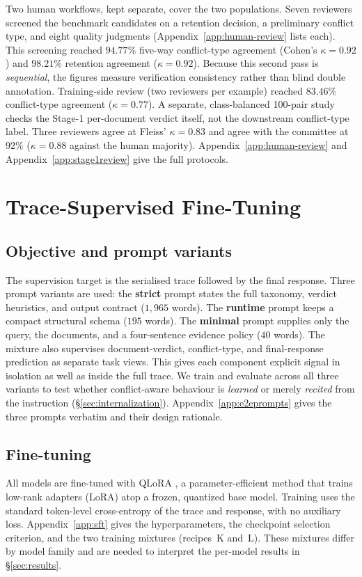 Two human workflows, kept separate, cover the two populations. Seven
reviewers screened the benchmark candidates on a retention decision, a
preliminary conflict type, and eight quality judgments
(Appendix~\ref{app:human-review} lists each). This screening reached
$94.77\%$ five-way conflict-type agreement (Cohen's $\kappa=0.92$) and $98.21\%$
retention agreement ($\kappa=0.92$). Because this second pass is
\emph{sequential}, the figures measure verification consistency rather than
blind double annotation. Training-side review (two reviewers per example)
reached $83.46\%$ conflict-type agreement ($\kappa=0.77$). A separate,
class-balanced 100-pair study checks the Stage-1 per-document verdict itself,
not the downstream conflict-type label. Three reviewers agree at Fleiss'
$\kappa=0.83$ and agree with the committee at $92\%$ ($\kappa=0.88$ against
the human majority). Appendix~\ref{app:human-review} and
Appendix~\ref{app:stage1review} give the full protocols.

\section{Trace-Supervised Fine-Tuning}
\label{sec:sft}

\subsection{Objective and prompt variants}

The supervision target is the serialised trace followed by the final response.
Three prompt variants are used: the \textbf{strict} prompt states the full
taxonomy, verdict heuristics, and output contract ($1{,}965$ words). The
\textbf{runtime} prompt keeps a compact structural schema ($195$ words). The
\textbf{minimal} prompt supplies only the query, the documents, and a
four-sentence evidence policy ($40$ words). The mixture also supervises
document-verdict, conflict-type, and final-response prediction as separate
task views. This gives each component explicit signal in isolation as well as
inside the full trace. We train and evaluate across all three variants to
test whether conflict-aware behaviour is \emph{learned} or merely
\emph{recited} from the instruction (\S\ref{sec:internalization}).
Appendix~\ref{app:e2eprompts} gives the three prompts verbatim and their
design rationale.

\subsection{Fine-tuning}
All models are fine-tuned with QLoRA
\citep{dettmers2023qloraefficientfinetuningquantized,hu2021loralowrankadaptationlarge},
a parameter-efficient method that trains low-rank adapters (LoRA) atop a
frozen, quantized base model. Training uses the standard
token-level cross-entropy of the trace and response, with no auxiliary loss.
Appendix~\ref{app:sft} gives the hyperparameters, the checkpoint selection
criterion, and the two training mixtures (recipes~K and~L). These mixtures
differ by model family and are needed to interpret the per-model results in
\S\ref{sec:results}.

